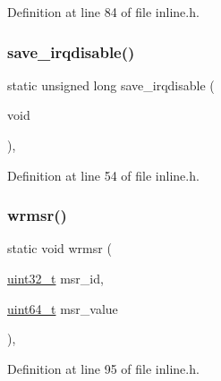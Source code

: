 Definition at line 84 of file inline.\+h.

\mbox{\label{a00035_ab1dca2d7fd57d56f7548a81ef081ba74_ab1dca2d7fd57d56f7548a81ef081ba74}} 
\subsubsection{\texorpdfstring{save\+\_\+irqdisable()}{save\_irqdisable()}}
{\footnotesize\ttfamily static unsigned long save\+\_\+irqdisable (\begin{DoxyParamCaption}\item[{void}]{ }\end{DoxyParamCaption})\hspace{0.3cm}{\ttfamily [inline]}, {\ttfamily [static]}}



Definition at line 54 of file inline.\+h.

\mbox{\label{a00035_a368f08346121290f513a26011e0f68f8_a368f08346121290f513a26011e0f68f8}} 
\subsubsection{\texorpdfstring{wrmsr()}{wrmsr()}}
{\footnotesize\ttfamily static void wrmsr (\begin{DoxyParamCaption}\item[{\hyperlink{a00032_a435d1572bf3f880d55459d9805097f62_a435d1572bf3f880d55459d9805097f62}{uint32\+\_\+t}}]{msr\+\_\+id,  }\item[{\hyperlink{a00032_aa232ecf786a74ce5363c36c10798d2b1_aa232ecf786a74ce5363c36c10798d2b1}{uint64\+\_\+t}}]{msr\+\_\+value }\end{DoxyParamCaption})\hspace{0.3cm}{\ttfamily [inline]}, {\ttfamily [static]}}



Definition at line 95 of file inline.\+h.

